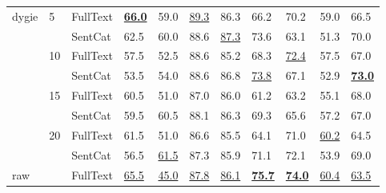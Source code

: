 \begin{tabular}{lllllllllll}
dygie & 5 & FullText &  \underline{\textbf{66.0}} &                       59.0 &           \underline{89.3} &                       86.3 &                       66.2 &                       70.2 &                       59.0 &                       66.5 \\
    &    & SentCat &                       62.5 &                       60.0 &                       88.6 &           \underline{87.3} &                       73.6 &                       63.1 &                       51.3 &                       70.0 \\
    & 10 & FullText &                       57.5 &                       52.5 &                       88.6 &                       85.2 &                       68.3 &           \underline{72.4} &                       57.5 &                       67.0 \\
    &    & SentCat &                       53.5 &                       54.0 &                       88.6 &                       86.8 &           \underline{73.8} &                       67.1 &                       52.9 &  \underline{\textbf{73.0}} \\
    & 15 & FullText &                       60.5 &                       51.0 &                       87.0 &                       86.0 &                       61.2 &                       63.2 &                       55.1 &                       68.0 \\
    &    & SentCat &                       59.5 &                       60.5 &                       88.1 &                       86.3 &                       69.3 &                       65.6 &                       57.2 &                       67.0 \\
    & 20 & FullText &                       61.5 &                       51.0 &                       86.6 &                       85.5 &                       64.1 &                       71.0 &           \underline{60.2} &                       64.5 \\
    &    & SentCat &                       56.5 &           \underline{61.5} &                       87.3 &                       85.9 &                       71.1 &                       72.1 &                       53.9 &                       69.0 \\
raw &    & FullText &           \underline{65.5} &           \underline{45.0} &           \underline{87.8} &           \underline{86.1} &  \underline{\textbf{75.7}} &  \underline{\textbf{74.0}} &           \underline{60.4} &           \underline{63.5} \\
\bottomrule
\end{tabular}

